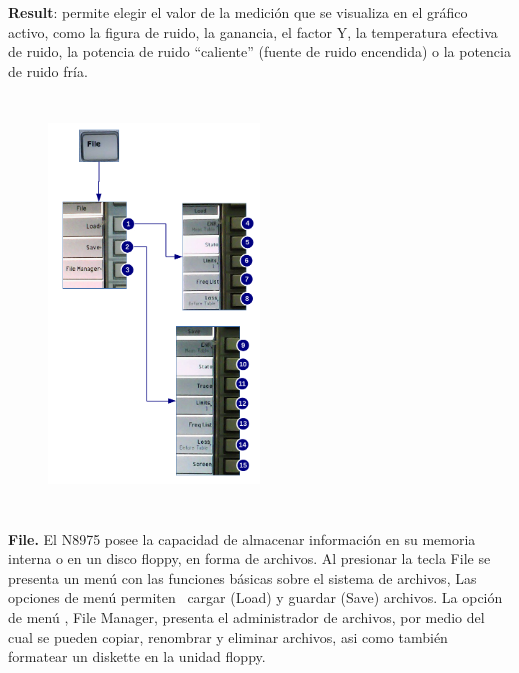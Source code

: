 {\begin{minipage}[t][10cm]{\textwidth}
		\textbf{Result}: permite	elegir el valor de la medición que se visualiza en el gráfico activo, como la figura de ruido, la ganancia, el factor Y, la temperatura efectiva de ruido, la potencia de ruido “caliente” (fuente de ruido encendida) o la potencia de ruido fría.
	\end{minipage}



	
	\begin{minipage}[t][11cm]{\textwidth}
		\begin{figure}		
			\includegraphics[width=0.5\textwidth, height=11cm, keepaspectratio]{./Imagenes/MenuFileN8975A.pdf}	
		\end{figure}		
		\textbf{File.} El N8975 posee la capacidad de almacenar información en su memoria interna o en un disco floppy, en forma de archivos. Al presionar la tecla File se presenta un menú con las funciones básicas sobre el sistema de archivos, Las opciones de menú permiten \ cargar (Load) y guardar (Save) archivos. La opción de menú , File Manager, presenta el administrador de archivos, por medio del cual se pueden copiar, renombrar y eliminar archivos, asi como también formatear un diskette en la unidad floppy.
		

\end{minipage}}
